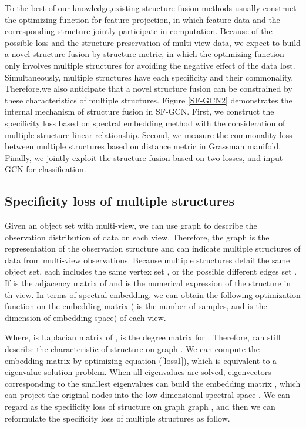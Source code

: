 \documentclass[review]{elsarticle}
\begin{document}
To the best of our knowledge,existing structure fusion methods usually construct the optimizing function for feature projection, in which feature data and the corresponding structure jointly participate in computation. Because of the possible loss and the structure preservation of multi-view data, we expect to build a novel structure fusion by structure metric, in which the optimizing function only involves multiple structures for avoiding the negative effect of the data lost. Simultaneously, multiple structures have each specificity and their commonality. Therefore,we also anticipate that a novel structure fusion can be constrained by these characteristics of multiple structures. Figure \ref{SF-GCN2} demonstrates the internal mechanism of structure fusion in SF-GCN. First, we construct the specificity loss based on spectral embedding method with the consideration of multiple structure linear relationship. Second, we measure the commonality loss between multiple structures based on distance metric in Grassman manifold. Finally, we jointly exploit the structure fusion based on two losses, and input GCN for classification.

\subsection{Specificity loss of multiple structures}
Given an object set with  multi-view, we can use graph  to describe the observation distribution of data on each view. Therefore, the graph  is the representation of the observation structure and  can indicate multiple structures of data from multi-view observations. Because multiple structures detail the same object set, each  includes the same vertex set , or the possible different edges set . If  is the adjacency matrix of  and is the numerical expression of the structure in th view. In terms of spectral embedding, we can obtain the following optimization function on the embedding matrix  ( is the number of samples, and  is the dimension of embedding space) of each view.


Where,  is Laplacian matrix of ,  is the degree matrix for . Therefore,  can still describe the characteristic of structure on graph . We can compute the embedding matrix  by optimizing equation (\ref{loss1}), which is equivalent to a eigenvalue solution problem. When all eigenvalues are solved, eigenvectors corresponding to the smallest eigenvalues can build the embedding matrix , which can project the original nodes into the low dimensional spectral space \cite{xia2010multiview}. We can regard  as the specificity loss of structure on graph graph , and then we can reformulate the specificity loss of multiple structures as follow.
\end{document}
